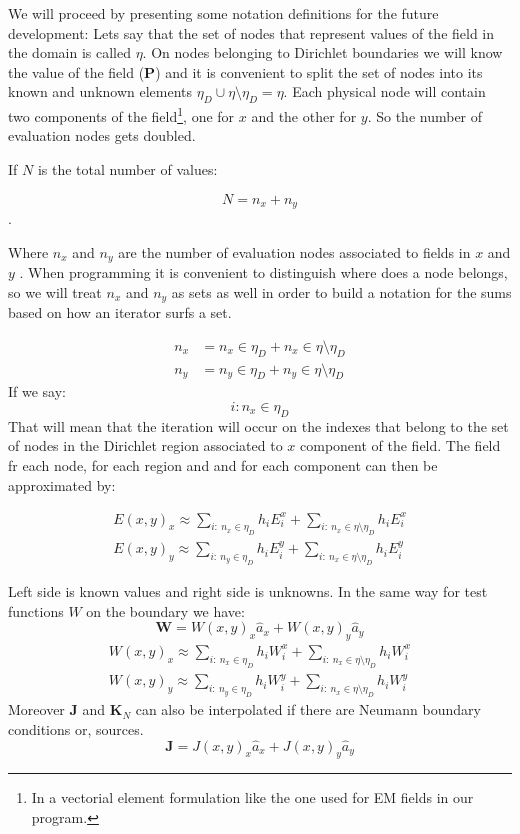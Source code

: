 We will proceed by presenting some notation definitions for the future development:
Lets say that the set of nodes that represent values of the field in the domain is called $\eta$. On nodes belonging to Dirichlet boundaries we will know the value of the field ($\mathbf{P}$) and it is convenient to split the set of nodes into its known and unknown elements $\eta_D\cup\eta\setminus\eta_D=\eta$.  Each physical node will contain two components of the field\footnote{In a vectorial element formulation like the one used for EM fields in our program.}, one for $x$ and the other for $y$. So the number of evaluation nodes gets doubled.

If $N$ is the total number of values:

\[N = n_x + n_y\].

Where $n_x$ and $n_y$ are the number of evaluation nodes associated to fields in $x$ and  $y$	. When programming it is convenient to distinguish where does a node belongs, so we will treat $n_x$ and $n_y$ as sets as well in order to build a notation for the sums based on  how an iterator surfs a set.


\begin{align*}
n_x &= n_x \in \eta_D + n_x \in \eta\setminus\eta_D\\
n_y &= n_y \in \eta_D + n_y \in \eta\setminus\eta_D
\end{align*}
If we say: $$i: n_x\in \eta_D$$  That will mean that the iteration will occur on the indexes that belong to the set of nodes in the Dirichlet region associated to $x$ component of the field. The field fr each node, for each region and and for each component can then be approximated by:

\begin{align*}
E(x,y)_x\approx \sum_{i:\ n_x \in \eta_D} h_i E_i^x+\sum_{i:\ n_x \in \eta\setminus\eta_D} h_i E_i^x \\
E(x,y)_y\approx \sum_{i:\ n_y \in \eta_D}h_iE_i^y+
\sum_{i:\ n_x \in \eta\setminus\eta_D}h_iE_i^y
\end{align*}
 
Left side is known values and right side is unknowns.
In the same way for test functions $W$ on the boundary we have: 
\[\mathbf{W}=W(x,y)_x\hat{a}_x + W(x,y)_y \hat{a}_y \]
\begin{align*}
W(x,y)_x\approx \sum_{i:\ n_x \in \eta_D} h_i W_i^x+\sum_{i:\ n_x \in \eta\setminus\eta_D} h_i W_i^x \\
W(x,y)_y\approx \sum_{i:\ n_y \in \eta_D}h_iW_i^y+
\sum_{i:\ n_x \in \eta\setminus\eta_D}h_iW_i^y
\end{align*}
Moreover $\mathbf{J}$ and $\mathbf{K}_N$ can also be interpolated if there are Neumann boundary conditions or, sources. 
\[\mathbf{J}=J(x,y)_x\hat{a}_x + J(x,y)_y \hat{a}_y \]

